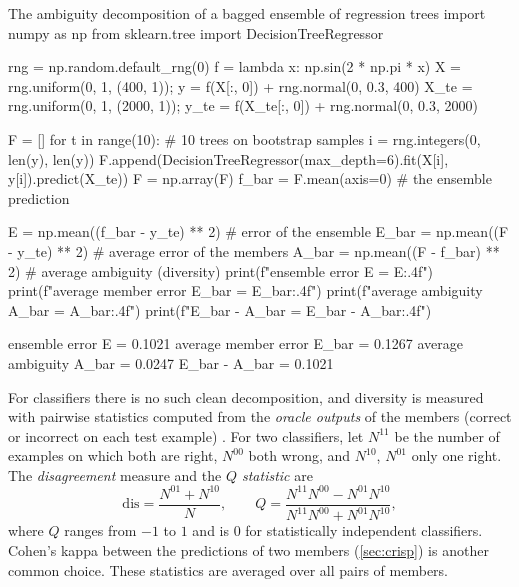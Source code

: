 \begin{pylisting}[label={lst:ambiguity}]{The ambiguity decomposition of a bagged ensemble of regression trees}
import numpy as np
from sklearn.tree import DecisionTreeRegressor

rng = np.random.default_rng(0)
f = lambda x: np.sin(2 * np.pi * x)
X = rng.uniform(0, 1, (400, 1));     y = f(X[:, 0]) + rng.normal(0, 0.3, 400)
X_te = rng.uniform(0, 1, (2000, 1)); y_te = f(X_te[:, 0]) + rng.normal(0, 0.3, 2000)

F = []
for t in range(10):                                    # 10 trees on bootstrap samples
    i = rng.integers(0, len(y), len(y))
    F.append(DecisionTreeRegressor(max_depth=6).fit(X[i], y[i]).predict(X_te))
F = np.array(F)
f_bar = F.mean(axis=0)                                 # the ensemble prediction

E = np.mean((f_bar - y_te) ** 2)                       # error of the ensemble
E_bar = np.mean((F - y_te) ** 2)                       # average error of the members
A_bar = np.mean((F - f_bar) ** 2)                      # average ambiguity (diversity)
print(f"ensemble error        E     = {E:.4f}")
print(f"average member error  E_bar = {E_bar:.4f}")
print(f"average ambiguity     A_bar = {A_bar:.4f}")
print(f"E_bar - A_bar               = {E_bar - A_bar:.4f}")
\end{pylisting}
\begin{pyoutput}
ensemble error        E     = 0.1021
average member error  E_bar = 0.1267
average ambiguity     A_bar = 0.0247
E_bar - A_bar               = 0.1021
\end{pyoutput}

For classifiers there is no such clean decomposition, and diversity is measured with pairwise
statistics computed from the \emph{oracle outputs} of the members (correct or incorrect on each
test example) \citep{kuncheva2003measures}. For two classifiers, let $N^{11}$ be the number of
examples on which both are right, $N^{00}$ both wrong, and $N^{10}$, $N^{01}$ only one right. The
\emph{disagreement} measure and the \emph{$Q$ statistic} are
\begin{equation}
  \mathrm{dis}=\frac{N^{01}+N^{10}}{N},\qquad
  Q=\frac{N^{11}N^{00}-N^{01}N^{10}}{N^{11}N^{00}+N^{01}N^{10}},
\end{equation}
where $Q$ ranges from $-1$ to $1$ and is 0 for statistically independent classifiers. Cohen's
kappa between the predictions of two members (\cref{sec:crisp}) is another common choice. These
statistics are averaged over all pairs of members.

